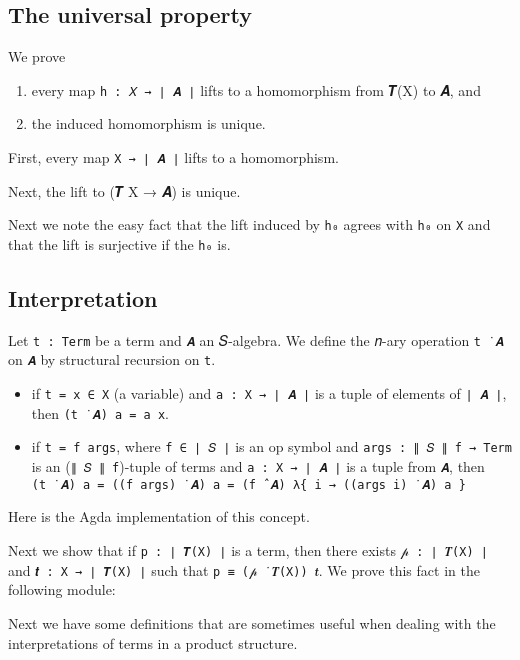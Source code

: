 \documentclass[sigplan,screen]{acmart}
\begin{document}
\subsection{The universal property}\label{the-universal-property}
We prove
\begin{enumerate}
\item every map \texttt{h\ :\ 𝑋\ →\ ∣\ 𝑨\ ∣} lifts to a homomorphism from 𝑻(X) to 𝑨, and
\item the induced homomorphism is unique.
\end{enumerate}
First, every map \texttt{X\ →\ ∣\ 𝑨\ ∣} lifts to a homomorphism.
\begin{code}\end{code}
Next, the lift to (𝑻 X → 𝑨) is unique.
\begin{code}\end{code}
Next we note the easy fact that the lift induced by \texttt{h₀} agrees with \texttt{h₀} on \texttt{X} and that the lift is surjective if the \texttt{h₀} is.
\begin{code}\end{code}

\subsection{Interpretation}\label{interpretation}
Let \texttt{t\ :\ Term} be a term and \texttt{𝑨} an 𝑆-algebra. We define the 𝑛-ary operation \texttt{t\ ̇\ 𝑨} on \texttt{𝑨} by structural recursion on \texttt{t}.
\begin{itemize}
\item if \texttt{t\ =\ x\ ∈\ X} (a variable) and
  \texttt{a\ :\ X\ →\ ∣\ 𝑨\ ∣} is a tuple of elements of
  \texttt{∣\ 𝑨\ ∣}, then \texttt{(t\ ̇\ 𝑨)\ a\ =\ a\ x}.
\item if \texttt{t\ =\ f\ args}, where \texttt{f\ ∈\ ∣\ 𝑆\ ∣} is an op
  symbol and \texttt{args\ :\ ∥\ 𝑆\ ∥\ f\ →\ Term} is an
  (\texttt{∥\ 𝑆\ ∥\ f})-tuple of terms and \texttt{a\ :\ X\ →\ ∣\ 𝑨\ ∣}
  is a tuple from \texttt{𝑨}, then
  \texttt{(t\ ̇\ 𝑨)\ a\ =\ ((f\ args)\ ̇\ 𝑨)\ a\ =\ (f\ ̂\ 𝑨)\ λ\{\ i\ →\ ((args\ i)\ ̇\ 𝑨)\ a\ \}}
\end{itemize}
Here is the Agda implementation of this concept.
\begin{code}\end{code}
Next we show that if \texttt{p\ :\ ∣\ 𝑻(X)\ ∣} is a term, then there exists \texttt{𝓅\ :\ ∣\ 𝑻(X)\ ∣} and \texttt{𝒕\ :\ X\ →\ ∣\ 𝑻(X)\ ∣} such that \texttt{p\ ≡\ (𝓅\ ̇\ 𝑻(X))\ 𝒕}. We prove this fact in the following module:
\begin{code}\end{code}
Next we have some definitions that are sometimes useful when dealing
with the interpretations of terms in a product structure.
\begin{code}\end{code}
\end{document}
